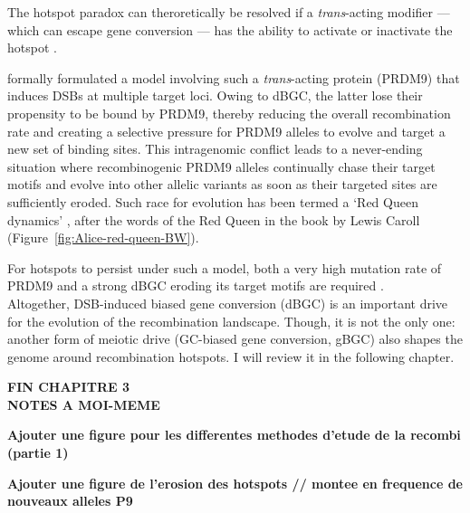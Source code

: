 The hotspot paradox can theroretically be resolved if a \textit{trans}-acting modifier — which can escape gene conversion — has the ability to activate or inactivate the hotspot \citep{peters2008combination,friberg2008cut}.

\citet{ubeda2011red} formally formulated a model involving such a \textit{trans}-acting protein (PRDM9) that induces DSBs at multiple target loci.
Owing to dBGC, the latter lose their propensity to be bound by PRDM9, thereby reducing the overall recombination rate and creating a selective pressure for PRDM9 alleles to evolve and target a new set of binding sites. 
This intragenomic conflict leads to a never-ending situation where recombinogenic PRDM9 alleles continually chase their target motifs and evolve into other allelic variants as soon as their targeted sites are sufficiently eroded.
Such race for evolution has been termed a ‘Red Queen dynamics’ \citep{vanvalen1973new}, after the words of the Red Queen in the \textit{} book by Lewis Caroll \citeyearpar{carroll1871lookingglass} (Figure~\ref{fig:Alice-red-queen-BW}).

For hotspots to persist under such a model, both a very high mutation rate of PRDM9 and a strong dBGC eroding its target motifs are required \citep{latrille2017red}.\\



Altogether, DSB-induced biased gene conversion (dBGC) is an important drive for the evolution of the recombination landscape.
Though, it is not the only one: another form of meiotic drive (GC-biased gene conversion, gBGC) also shapes the genome around recombination hotspots. 
I will review it in the following chapter.

\textbf{FIN CHAPITRE 3}\\



\textbf{NOTES A MOI-MEME} 

\textbf{Ajouter une figure pour les differentes methodes d'etude de la recombi (partie 1)}

\textbf{Ajouter une figure de l'erosion des hotspots // montee en frequence de nouveaux alleles P9}


